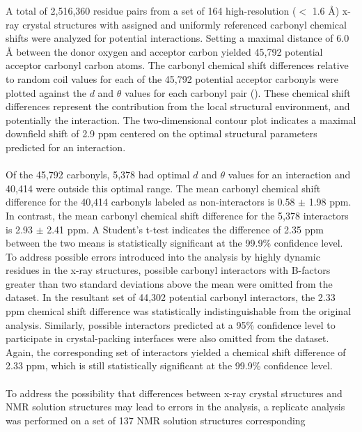 \begin{doublespace}
A total of 2,516,360 residue pairs from a set of 164 high-resolution
($<$ 1.6 \r{A}) x-ray crystal structures with assigned and uniformly referenced
carbonyl \cnmr{} chemical shifts were analyzed for potential \npistar{}
interactions. Setting a maximal distance of 6.0 \r{A} between the donor oxygen
and acceptor carbon yielded 45,792 potential acceptor carbonyl carbon atoms.
The carbonyl \cnmr{} chemical shift differences relative to random coil values
for each of the 45,792 potential acceptor carbonyls were plotted against the
$d$ and $\theta$ values for each carbonyl pair ().
These chemical shift differences represent the contribution from the local
structural environment, and potentially the \npistar{} interaction. The
two-dimensional contour plot indicates a maximal downfield shift of 2.9 ppm
centered on the optimal structural parameters predicted for
an \npistar{} interaction.
\\\\
Of the 45,792 carbonyls, 5,378 had optimal $d$ and $\theta$ values for an
\npistar{} interaction and 40,414 were outside this optimal range. The mean
carbonyl \cnmr{} chemical shift difference for the 40,414 carbonyls labeled as
non-interactors is 0.58 $\pm$ 1.98 ppm. In contrast, the mean carbonyl \cnmr{}
chemical shift difference for the 5,378 interactors is 2.93 $\pm$ 2.41 ppm. A
Student's t-test indicates the difference of 2.35 ppm between the two means is
statistically significant at the 99.9\% confidence level. To address possible
errors introduced into the analysis by highly dynamic residues in the x-ray
structures, possible carbonyl interactors with B-factors greater than two
standard deviations above the mean were omitted from the dataset. In the
resultant set of 44,302 potential carbonyl interactors, the 2.33 ppm chemical
shift difference was statistically indistinguishable from the original
analysis. Similarly, possible interactors predicted at a 95\% confidence level
to participate in crystal-packing interfaces were also omitted from the
dataset. Again, the corresponding set of interactors yielded a chemical shift
difference of 2.33 ppm, which is still statistically significant at the 99.9\%
confidence level.
\\\\
To address the possibility that differences between x-ray crystal structures
and NMR solution structures may lead to errors in the analysis, a replicate
analysis was performed on a set of 137 NMR solution structures corresponding

\end{doublespace}
